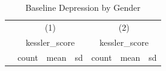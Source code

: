\begin{table}[htbp]\centering
\def\sym#1{\ifmmode^{#1}\else\(^{#1}\)\fi}
\caption{Baseline Depression by Gender}
\begin{tabular}{l*{2}{ccc}}
\toprule
            &\multicolumn{3}{c}{(1)}               &\multicolumn{3}{c}{(2)}               \\
            &\multicolumn{3}{c}{kessler\_score}     &\multicolumn{3}{c}{kessler\_score}     \\
            &       count&        mean&          sd&       count&        mean&          sd\\
\midrule
\bottomrule
\end{tabular}
\end{table}
